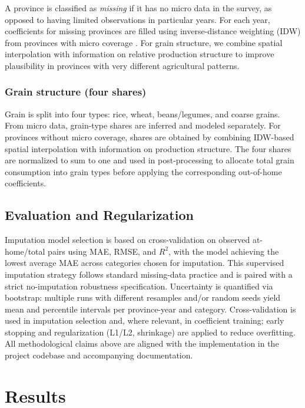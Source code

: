 \documentclass[12pt,a4paper]{article}
\begin{document}
A province is classified as \emph{missing} if it has no micro data in the survey, as opposed to having limited observations in particular years. For each year, coefficients for missing provinces are filled using inverse-distance weighting (IDW) from provinces with micro coverage \citep{Shepard1968IDW}. For grain structure, we combine spatial interpolation with information on relative production structure to improve plausibility in provinces with very different agricultural patterns.

\subsubsection{Grain structure (four shares)}

Grain is split into four types: rice, wheat, beans/legumes, and coarse grains. From micro data, grain-type shares are inferred and modeled separately. For provinces without micro coverage, shares are obtained by combining IDW-based spatial interpolation with information on production structure. The four shares are normalized to sum to one and used in post-processing to allocate total grain consumption into grain types before applying the corresponding out-of-home coefficients.

\subsection{Evaluation and Regularization}

Imputation model selection is based on cross-validation on observed at-home/total pairs using MAE, RMSE, and $R^2$, with the model achieving the lowest average MAE across categories chosen for imputation. This supervised imputation strategy follows standard missing-data practice \citep{Rubin1987} and is paired with a strict no-imputation robustness specification. Uncertainty is quantified via bootstrap: multiple runs with different resamples and/or random seeds yield mean and percentile intervals per province-year and category. Cross-validation is used in imputation selection and, where relevant, in coefficient training; early stopping and regularization (L1/L2, shrinkage) are applied to reduce overfitting. All methodological claims above are aligned with the implementation in the project codebase and accompanying documentation.

\section{Results}
\label{sec:results}
\end{document}

